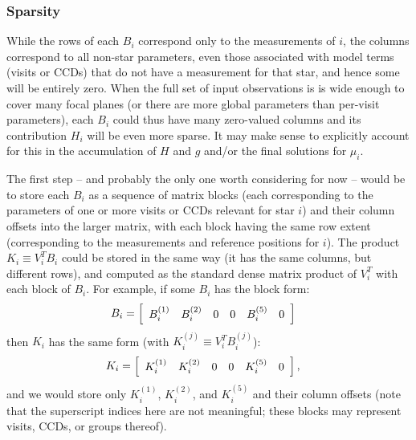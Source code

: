 \subsubsection{Sparsity}
\label{subsec:vp_sparsity}

While the rows of each $B_i$ correspond only to the measurements of  $i$, the columns correspond to all non-star parameters, even those associated with model terms (visits or CCDs) that do not have a measurement for that star, and hence some will be entirely zero.
When the full set of input observations is is wide enough to cover many focal planes (or there are more global parameters than per-visit parameters), each $B_i$ could thus have many zero-valued columns and its contribution $H_i$ will be even more sparse.
It may make sense to explicitly account for this in the accumulation of $H$ and $g$ and/or the final solutions for $\mu_i$.

The first step -- and probably the only one worth considering for now -- would be to store each $B_i$ as a sequence of matrix blocks (each corresponding to the parameters of one or more visits or CCDs relevant for star $i$) and their column offsets into the larger matrix, with each block having the same row extent (corresponding to the measurements and reference positions for $i$).
The product $K_i \equiv V_i^T B_i$ could be stored in the same way (it has the same columns, but different rows), and computed as the standard dense matrix product of $V_i^T$ with each block of $B_i$.
For example, if some $B_i$ has the block form:
\begin{align}
    B_i &= \left[
        \begin{array}{ c c c c c c }
            B_i^{(1)} & B_i^{(2)} & 0 & 0 & B_i^{(5)} & 0
        \end{array}
    \right]
\end{align}
then $K_i$ has the same form (with $K_i^{(j)} \equiv V_i^T B_i^{(j)}$):
\begin{align}
    K_i &= \left[
        \begin{array}{ c c c c c c }
            K_i^{(1)} & K_i^{(2)} & 0 & 0 & K_i^{(5)} & 0
        \end{array}
    \right],
\end{align}
and we would store only $K_i^{(1)}$, $K_i^{(2)}$, and $K_i^{(5)}$ and their column offsets (note that the superscript indices here are not meaningful; these blocks may represent visits, CCDs, or groups thereof).

